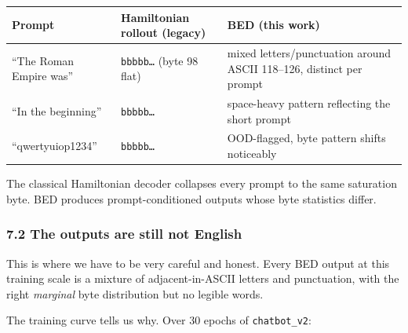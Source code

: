 \documentclass[
  11pt,
  a4paper,
]{article}
\begin{document}
\begin{longtable}[]{@{}
  >{\raggedright\arraybackslash}p{}
  >{\raggedright\arraybackslash}p{}
  >{\raggedright\arraybackslash}p{}@{}}
\toprule\noalign{}
\begin{minipage}[b]{\linewidth}\raggedright
Prompt
\end{minipage} & \begin{minipage}[b]{\linewidth}\raggedright
Hamiltonian rollout (legacy)
\end{minipage} & \begin{minipage}[b]{\linewidth}\raggedright
BED (this work)
\end{minipage} \\
\midrule\noalign{}
\endhead
\bottomrule\noalign{}
\endlastfoot
``The Roman Empire was'' & \texttt{bbbbb…} (byte 98 flat) & mixed
letters/punctuation around ASCII 118--126, distinct per prompt \\
``In the beginning'' & \texttt{bbbbb…} & space-heavy pattern reflecting
the short prompt \\
``qwertyuiop1234'' & \texttt{bbbbb…} & OOD-flagged, byte pattern shifts
noticeably \\
\end{longtable}

The classical Hamiltonian decoder collapses every prompt to the same
saturation byte. BED produces prompt-conditioned outputs whose byte
statistics differ.

\subsubsection{7.2 The outputs are still not
English}\label{the-outputs-are-still-not-english}

This is where we have to be very careful and honest. Every BED output at
this training scale is a mixture of adjacent-in-ASCII letters and
punctuation, with the right \emph{marginal} byte distribution but no
legible words.

The training curve tells us why. Over 30 epochs of \texttt{chatbot\_v2}:
\end{document}
